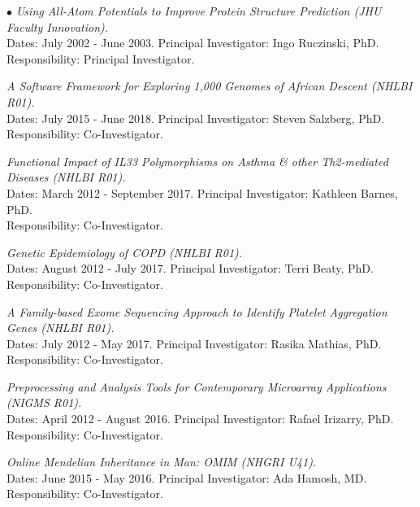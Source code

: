 \documentclass[10pt]{article}
\newcommand{\dn}[1]{{\color{black} {#1}}}
\begin{document}
\item[$\bullet$]
{\it Using All-Atom Potentials to Improve Protein Structure Prediction (JHU Faculty Innovation).}\\[0.0em]
\dn{Dates:} July 2002 - June 2003.
\dn{Principal Investigator:} Ingo Ruczinski, PhD.\\
\dn{Responsibility:} Principal Investigator.

\item
{\it A Software Framework for Exploring 1,000 Genomes of African Descent (NHLBI R01).}\\[0.0em]
\dn{Dates:} July 2015 - June 2018.
\dn{Principal Investigator:} Steven Salzberg, PhD.\\
\dn{Responsibility:} Co-Investigator.

\item
{\it Functional Impact of IL33 Polymorphisms on Asthma \& other Th2-mediated Diseases (NHLBI R01).}\\[0.0em]
\dn{Dates:} March 2012 - September 2017.
\dn{Principal Investigator:} Kathleen Barnes, PhD.\\
\dn{Responsibility:} Co-Investigator.

\item
{\it Genetic Epidemiology of COPD (NHLBI R01).}\\[0.0em]
\dn{Dates:} August 2012 - July 2017.
\dn{Principal Investigator:} Terri Beaty, PhD.\\
\dn{Responsibility:} Co-Investigator.

\item
{\it A Family-based Exome Sequencing Approach to Identify Platelet Aggregation Genes (NHLBI R01).}\\[0.0em]
\dn{Dates:} July 2012 - May 2017.
\dn{Principal Investigator:} Rasika Mathias, PhD.\\
\dn{Responsibility:} Co-Investigator.

\item
{\it Preprocessing and Analysis Tools for Contemporary Microarray Applications (NIGMS R01).}\\[0.0em]
\dn{Dates:} April 2012 - August 2016.
\dn{Principal Investigator:} Rafael Irizarry, PhD.\\
\dn{Responsibility:} Co-Investigator.

\item
{\it Online Mendelian Inheritance in Man: OMIM (NHGRI U41).}\\[0.0em]
\dn{Dates:} June 2015 - May 2016.
\dn{Principal Investigator:} Ada Hamosh, MD.\\
\dn{Responsibility:} Co-Investigator.
\end{document}
